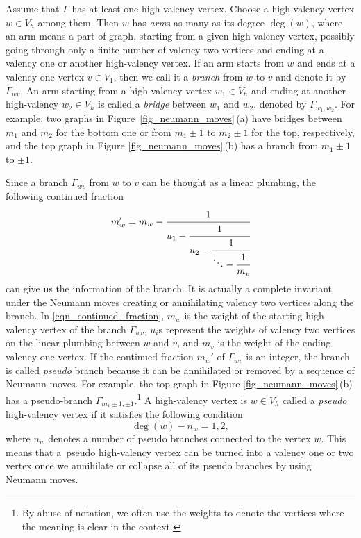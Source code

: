 \documentclass[11pt]{article}
\numberwithin{equation}{section}
\numberwithin{equation}{section}
\begin{document}
Assume that $ \Gamma $ has at least one high-valency vertex. Choose a high-valency vertex $ w\in V_h $ among them. Then $ w $ has \textit{arm}s as many as its degree $ \deg(w) $, where an arm means a part of graph, starting from a given high-valency vertex, possibly going through only a finite number of valency two vertices and ending at a valency one or another high-valency vertex. If an arm starts from $ w $ and ends at a valency one vertex $ v\in V_1 $, then we call it a \textit{branch} from $ w $ to $ v $ and denote it by $ \Gamma_{wv} $. An arm starting from a high-valency vertex $ w_1\in V_h $ and ending at another high-valency $ w_2\in V_h $ is called a \textit{bridge} between $ w_1 $ and $ w_2 $, denoted by $ \Gamma_{w_1,w_2} $. For example, two graphs in Figure~\ref{fig_neumann_moves}\,(a) have bridges between $ m_1 $ and $ m_2 $ for the bottom one or from $ m_1\pm 1 $ to $ m_2\pm 1 $ for the top, respectively, and the top graph in Figure \ref{fig_neumann_moves}\,(b) has a branch from $ m_1\pm 1 $ to $ \pm 1 $.

Since a branch $ \Gamma_{wv} $ from $ w $ to $ v $ can be thought as a linear plumbing, the following continued fraction
\begin{equation}\label{eqn_continued_fraction}
	m_w'=m_w-\cfrac{1}{u_1-\cfrac{1}{u_2-\cfrac{1}{\ddots - \cfrac{1}{m_v}}}}
\end{equation}
can give us the information of the branch. It is actually a complete invariant under the Neumann moves creating or annihilating valency two vertices along the branch. In \eqref{eqn_continued_fraction}, $ m_w $ is the weight of the starting high-valency vertex of the branch $ \Gamma_{wv} $, $ u_i $s represent the weights of valency two vertices on the linear plumbing between $ w $ and $ v $, and $ m_v $ is the weight of the ending valency one vertex. If the continued fraction $ m_w' $ of $ \Gamma_{wv} $ is an integer, the branch is called \textit{pseudo} branch because it can be annihilated or removed by a sequence of Neumann moves. For example, the top graph in Figure \ref{fig_neumann_moves}\,(b) has a pseudo-branch $\Gamma_{m_1\pm1, \pm1}$.\footnote{By abuse of notation, we often use the weights to denote the vertices where the meaning is clear in the context.} A high-valency vertex is $w\in V_h$ called a \textit{pseudo} high-valency vertex if it satisfies the following condition
\[
\deg(w) - n_w = 1, 2,
\]
where $n_w$ denotes a number of pseudo branches connected to the vertex $w$. This means that a~pseudo high-valency vertex can be turned into a valency one or two vertex once we annihilate or collapse all of its pseudo branches by using Neumann moves.
\end{document}
